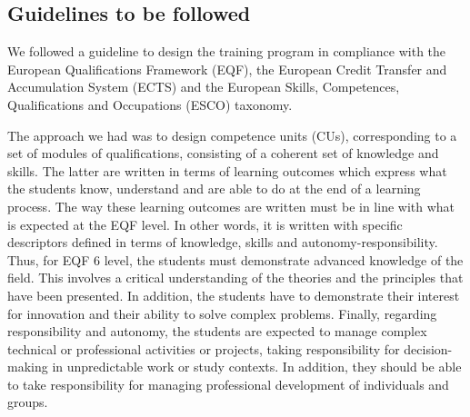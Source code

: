 \documentclass[conference]{IEEEtran}
\begin{document}
\subsection{Guidelines to be followed}
We followed a guideline to design the training program in compliance with the European Qualifications Framework (EQF), the European Credit Transfer and Accumulation System (ECTS) and the European Skills, Competences, Qualifications and Occupations (ESCO) taxonomy.

\noindent The approach we had was to design competence units (CUs), corresponding to a set of modules of qualifications, consisting of a coherent set of knowledge and skills. The latter are written in terms of learning outcomes which express what the students know, understand and are able to do at the end of a learning process. The way these learning outcomes are written must be in line with what is expected at the EQF level. In other words, it is written with specific descriptors defined in terms of knowledge, skills and autonomy-responsibility. Thus, for EQF 6 level, the students must demonstrate advanced knowledge of the field. This involves a critical understanding of the theories and the principles that have been presented. In addition, the students have to demonstrate their interest for innovation and their ability to solve complex problems. Finally, regarding responsibility and autonomy, the students are expected to manage complex technical or professional activities or projects, taking responsibility for decision-making in unpredictable work or study contexts. In addition, they should be able to take responsibility for managing professional development of individuals and groups. 
\end{document}

